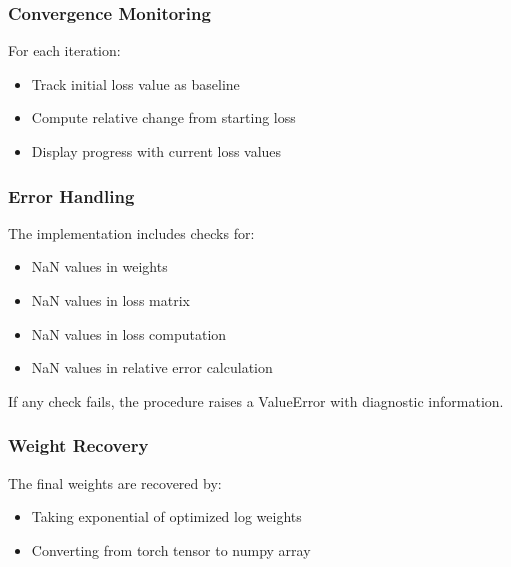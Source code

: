 \subsubsection{Convergence Monitoring}

For each iteration:
\begin{itemize}
    \item Track initial loss value as baseline
    \item Compute relative change from starting loss
    \item Display progress with current loss values
\end{itemize}

\subsubsection{Error Handling}

The implementation includes checks for:
\begin{itemize}
    \item NaN values in weights
    \item NaN values in loss matrix
    \item NaN values in loss computation
    \item NaN values in relative error calculation
\end{itemize}

If any check fails, the procedure raises a ValueError with diagnostic information.

\subsubsection{Weight Recovery}

The final weights are recovered by:
\begin{itemize}
    \item Taking exponential of optimized log weights
    \item Converting from torch tensor to numpy array
\end{itemize}